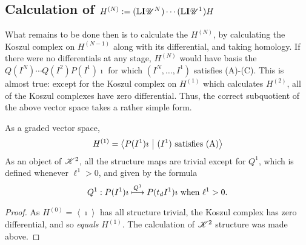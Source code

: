 \documentclass[11pt]{article}
\newcommand{\LL}[1]{{\scrK}^{#1}}%
\newcommand{\nontop}[1]{\scrU^{#1}}%
\newcommand{\Ind}[2][]{\mathbf{I}{#2}_{#1}}%
\newcommand{\derived}{\mathbb{L}}
\renewcommand{\Q}{Q}
\newcommand{\SqShift}{\Sq_{+}}
\newcommand{\Sq}{\mathrm{Sq}}
\newcommand{\minDim}{m}
\begin{document}
\begin{CalculatingRepeatedKoszul}
\begin{KoszulSequenceCombinatorics}

\end{KoszulSequenceCombinatorics}

\subsection{Calculation of $H^{(N)}:=(\derived\Ind{\nontop{N}})\cdots (\derived\Ind{\nontop{1}})H$}

What remains to be done then is to calculate the $H^{(N)}$, by calculating the Koszul complex on $H^{(N-1)}$ along with its differential, and taking homology. If there were no differentials at any stage, $H^{(N)}$ would have basis the $\Q(I^N)\cdots \Q(I^2)P(I^1)\imath$ for which $(I^N,\ldots,I^1)$ satisfies (A)-(C). This is almost true: except for the Koszul complex on $H^{(1)}$ which calculates $H^{(2)}$, all of the Koszul complexes have zero differential. Thus, the correct subquotient of the above vector space takes a rather simple form.




\begin{prop*}
As a graded vector space,
\[H^{(1)}=\left\langle P(I^1)\imath\ \middle|\ (I^1)\textup{ satisfies (A)}\right\rangle\]
As an object of $\LL{2}$, all the structure maps are trivial except for $\Q^1$, which is defined whenever $\ell^1>0$, and given by the formula
\[\Q^1:P(I^1)\imath\overset{\Q^1}{\mapsto} P(t_dI^1)\imath\textup{ when $\ell^1>0$}.\]
\end{prop*}
\begin{proof}
As $H^{(0)}=\left\langle \imath\right\rangle$ has all structure trivial, the Koszul complex has zero differential, and so \emph{equals} $H^{(1)}$. The calculation of $\LL{2}$ structure was made above.
\end{proof}


\end{CalculatingRepeatedKoszul}
\end{document}
